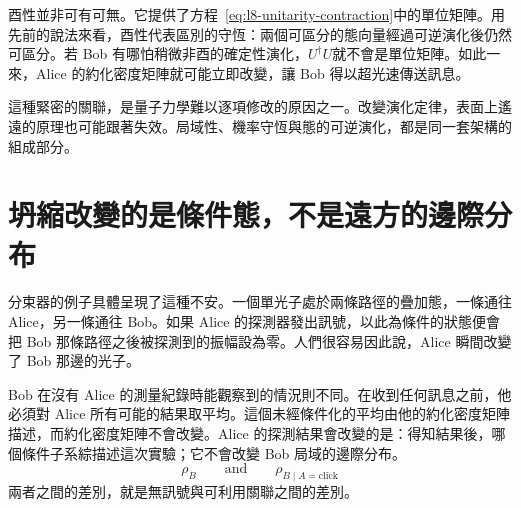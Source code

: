 酉性並非可有可無。它提供了方程~\eqref{eq:l8-unitarity-contraction}中的單位矩陣。用先前的說法來看，酉性代表區別的守恆：兩個可區分的態向量經過可逆演化後仍然可區分。若 Bob 有哪怕稍微非酉的確定性演化，\(U^\dagger U\)就不會是單位矩陣。如此一來，Alice 的約化密度矩陣就可能立即改變，讓 Bob 得以超光速傳送訊息。

這種緊密的關聯，是量子力學難以逐項修改的原因之一。改變演化定律，表面上遙遠的原理也可能跟著失效。局域性、機率守恆與態的可逆演化，都是同一套架構的組成部分。

\begin{classroomqa}
\end{classroomqa}

\section{坍縮改變的是條件態，不是遠方的邊際分布}

分束器的例子具體呈現了這種不安。一個單光子處於兩條路徑的疊加態，一條通往 Alice，另一條通往 Bob。如果 Alice 的探測器發出訊號，以此為條件的狀態便會把 Bob 那條路徑之後被探測到的振幅設為零。人們很容易因此說，Alice 瞬間改變了 Bob 那邊的光子。

Bob 在沒有 Alice 的測量紀錄時能觀察到的情況則不同。在收到任何訊息之前，他必須對 Alice 所有可能的結果取平均。這個未經條件化的平均由他的約化密度矩陣描述，而約化密度矩陣不會改變。Alice 的探測結果會改變的是：得知結果後，哪個條件子系綜描述這次實驗；它不會改變 Bob 局域的邊際分布。
\begin{equation}
\rho_B
\qquad\text{and}\qquad
\rho_{B\mid A=\text{click}}
\end{equation}
兩者之間的差別，就是無訊號與可利用關聯之間的差別。

\begin{classroomqa}
\end{classroomqa}

\begin{classroomqa}
\end{classroomqa}

